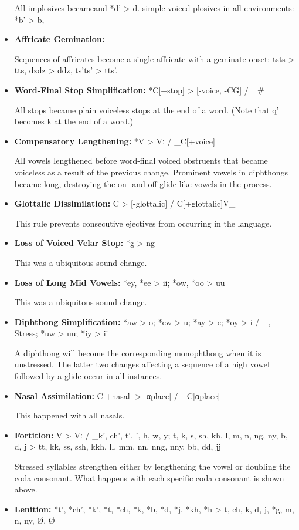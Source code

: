\begin{itemize}
All implosives becameand *d' > d.
simple voiced plosives in all environments: *b' > b,
\item
\textbf{Affricate Gemination:}

Sequences of affricates become a single affricate with a geminate onset: tsts > tts, dzdz > ddz, ts'ts' > tts'.
\item
\textbf{Word-Final Stop Simplification:}
*C[+stop] > [-voice, -CG] / \_\#

All stops became plain voiceless stops at the end of a word.
(Note that q' becomes k at the end of a word.)
\item
\textbf{Compensatory Lengthening:}
*V > Vː / \_C[+voice]

All vowels lengthened before word-final voiced obstruents that became voiceless as a result of the previous change.
Prominent vowels in diphthongs became long, destroying the on- and off-glide-like vowels in the process.
\item
\textbf{Glottalic Dissimilation:}
C > [-glottalic] / C[+glottalic]V\_

This rule prevents consecutive ejectives from occurring in the language.
\item
\textbf{Loss of Voiced Velar Stop:}
*g > ng

This was a ubiquitous sound change.
\item
\textbf{Loss of Long Mid Vowels:}
*ey, *ee > ii; *ow, *oo > uu

This was a ubiquitous sound change.
\item
\textbf{Diphthong Simplification:}
*aw > o; *ew > u; *ay > e; *oy > i / \_, Stress; *uw > uu; *iy > ii

A diphthong will become the corresponding monophthong when it is unstressed.
The latter two changes affecting a sequence of a high vowel followed by a glide occur in all instances.
\item
\textbf{Nasal Assimilation:}
C[+nasal] > [αplace] / \_C[αplace]

This happened with all nasals.
\item
\textbf{Fortition:}
V > Vː / \_k', ch', t', ', h, w, y; t, k, s, sh, kh, l, m, n, ng, ny, b, d, j > tt, kk, ss, ssh, kkh, ll, mm, nn, nng, nny, bb, dd, jj

Stressed syllables strengthen either by lengthening the vowel or doubling the coda consonant.
What happens with each specific coda consonant is shown above.
\item
\textbf{Lenition:}
*t', *ch', *k', *t, *ch, *k, *b, *d, *j, *kh, *h > t, ch, k, d, j, *g, m, n, ny, Ø, Ø


\end{itemize}

